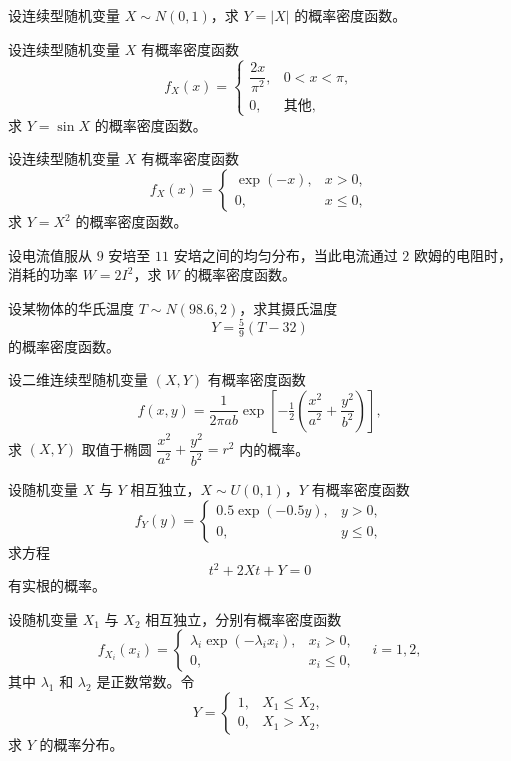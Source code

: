 \begin{homework}[2.45]
设连续型随机变量 $X \sim N(0,1)$，求 $Y = |X|$ 的概率密度函数。
\end{homework}

\begin{homework}[2.46]
设连续型随机变量 $X$ 有概率密度函数
\[
f_X(x) =
\begin{cases}
\dfrac{2x}{\pi^2}, & 0 < x < \pi, \\[6pt]
0, & \text{其他},
\end{cases}
\]
求 $Y = \sin X$ 的概率密度函数。
\end{homework}

\begin{homework}[2.47]
设连续型随机变量 $X$ 有概率密度函数
\[
f_X(x) =
\begin{cases}
\exp(-x), & x > 0, \\[6pt]
0, & x \leq 0,
\end{cases}
\]
求 $Y = X^2$ 的概率密度函数。
\end{homework}

\begin{homework}[2.48]
设电流值服从 $9$ 安培至 $11$ 安培之间的均匀分布，当此电流通过 $2$ 欧姆的电阻时，消耗的功率 $W = 2I^2$，求 $W$ 的概率密度函数。
\end{homework}
\begin{homework}[2.49]
设某物体的华氏温度 $T \sim N(98.6, 2)$，求其摄氏温度
\[
Y = \tfrac{5}{9}(T - 32)
\]
的概率密度函数。
\end{homework}

\begin{homework}[2.50]
设二维连续型随机变量 $(X,Y)$ 有概率密度函数
\[
f(x,y) = \frac{1}{2\pi ab} \exp \!\left[ -\tfrac{1}{2} \!\left( \frac{x^2}{a^2} + \frac{y^2}{b^2} \right) \right],
\]
求 $(X,Y)$ 取值于椭圆 $\dfrac{x^2}{a^2} + \dfrac{y^2}{b^2} = r^2$ 内的概率。
\end{homework}

\begin{homework}[2.51]
设随机变量 $X$ 与 $Y$ 相互独立，$X \sim U(0,1)$，$Y$ 有概率密度函数
\[
f_Y(y) =
\begin{cases}
0.5 \exp(-0.5y), & y > 0, \\
0, & y \leq 0,
\end{cases}
\]
求方程
\[
t^2 + 2Xt + Y = 0
\]
有实根的概率。
\end{homework}

\begin{homework}[2.52]
设随机变量 $X_1$ 与 $X_2$ 相互独立，分别有概率密度函数
\[
f_{X_i}(x_i) =
\begin{cases}
\lambda_i \exp(-\lambda_i x_i), & x_i > 0, \\
0, & x_i \leq 0,
\end{cases}
\quad i=1,2,
\]
其中 $\lambda_1$ 和 $\lambda_2$ 是正数常数。令
\[
Y =
\begin{cases}
1, & X_1 \leq X_2, \\
0, & X_1 > X_2,
\end{cases}
\]
求 $Y$ 的概率分布。
\end{homework}


